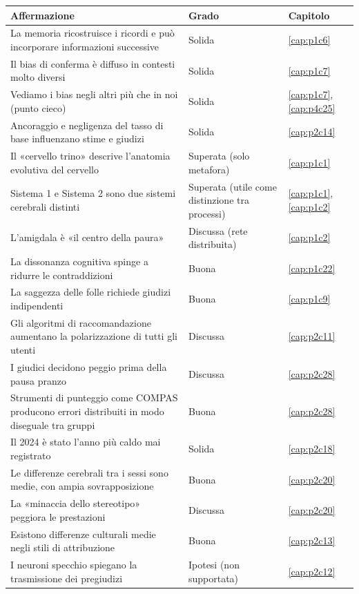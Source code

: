 {\small
\renewcommand{\arraystretch}{1.25}
\begin{longtable}{p{}p{}p{}}
\toprule
\textbf{Affermazione} & \textbf{Grado} & \textbf{Capitolo}\\
\midrule
\endhead
La memoria ricostruisce i ricordi e può incorporare informazioni successive & Solida & \ref{cap:p1c6}\\
Il bias di conferma è diffuso in contesti molto diversi & Solida & \ref{cap:p1c7}\\
Vediamo i bias negli altri più che in noi (punto cieco) & Solida & \ref{cap:p1c7}, \ref{cap:p4c25}\\
Ancoraggio e negligenza del tasso di base influenzano stime e giudizi & Solida & \ref{cap:p2c14}\\
Il «cervello trino» descrive l'anatomia evolutiva del cervello & Superata (solo metafora) & \ref{cap:p1c1}\\
Sistema 1 e Sistema 2 sono due sistemi cerebrali distinti & Superata (utile come distinzione tra processi) & \ref{cap:p1c1}, \ref{cap:p1c2}\\
L'amigdala è «il centro della paura» & Discussa (rete distribuita) & \ref{cap:p1c2}\\
La dissonanza cognitiva spinge a ridurre le contraddizioni & Buona & \ref{cap:p1c22}\\
La saggezza delle folle richiede giudizi indipendenti & Buona & \ref{cap:p1c9}\\
Gli algoritmi di raccomandazione aumentano la polarizzazione di tutti gli utenti & Discussa & \ref{cap:p2c11}\\
I giudici decidono peggio prima della pausa pranzo & Discussa & \ref{cap:p2c28}\\
Strumenti di punteggio come COMPAS producono errori distribuiti in modo diseguale tra gruppi & Buona & \ref{cap:p2c28}\\
Il 2024 è stato l'anno più caldo mai registrato & Solida & \ref{cap:p2c18}\\
Le differenze cerebrali tra i sessi sono medie, con ampia sovrapposizione & Buona & \ref{cap:p2c20}\\
La «minaccia dello stereotipo» peggiora le prestazioni & Discussa & \ref{cap:p2c20}\\
Esistono differenze culturali medie negli stili di attribuzione & Buona & \ref{cap:p2c13}\\
I neuroni specchio spiegano la trasmissione dei pregiudizi & Ipotesi (non supportata) & \ref{cap:p2c12}\\

\end{longtable}}
